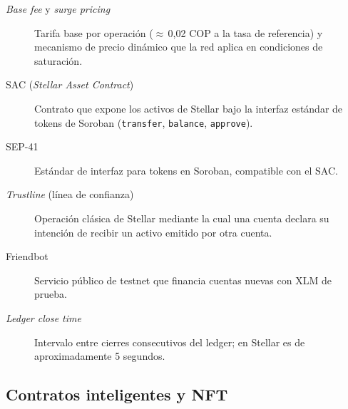 \begin{description}
\item[\textit{Base fee} y \textit{surge pricing}] Tarifa base por operación ($\approx$\,0{,}02 COP a la tasa de referencia) y mecanismo de precio dinámico que la red aplica en condiciones de saturación.
\item[SAC (\textit{Stellar Asset Contract})] Contrato que expone los activos de Stellar bajo la interfaz estándar de tokens de Soroban (\texttt{transfer}, \texttt{balance}, \texttt{approve}).
\item[SEP-41] Estándar de interfaz para tokens en Soroban, compatible con el SAC.
\item[\textit{Trustline} (línea de confianza)] Operación clásica de Stellar mediante la cual una cuenta declara su intención de recibir un activo emitido por otra cuenta.
\item[Friendbot] Servicio público de testnet que financia cuentas nuevas con XLM de prueba.
\item[\textit{Ledger close time}] Intervalo entre cierres consecutivos del ledger; en Stellar es de aproximadamente 5 segundos.
\end{description}

\subsection*{Contratos inteligentes y NFT}

